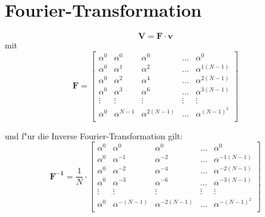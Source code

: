 \documentclass[german, 10pt, a4paper, twocolumn]{scrartcl}
\begin{document}
\appendix

\section{Fourier-Transformation}

\begin{displaymath}
	\mathbf{V} = \mathbf{F} \cdotp \mathbf{v}
\end{displaymath}
mit
\begin{displaymath}
	\mathbf{F} = \left [
		\begin{array}{ccccc}
			\alpha^0 &	\alpha^0 &	\alpha^0 &	\ldots &	\alpha^0 \\
			\alpha^0 &	\alpha^1 &	\alpha^2 &	\ldots &	\alpha^{1(N-1)} \\
			\alpha^0 &	\alpha^2 &	\alpha^4 &	\ldots &	\alpha^{2(N-1)} \\
			\alpha^0 &	\alpha^3 &	\alpha^6 &	\ldots &	\alpha^{3(N-1)} \\
			\vdots &	\vdots &	\vdots &	\vdots &	\vdots \\
			\alpha^0 &	\alpha^{N-1} &	\alpha^{2(N-1)} &	\ldots &	\alpha^{(N-1)^2} \\
		\end{array}
		\right ]
\end{displaymath}

und f"ur die Inverse Fourier-Transformation gilt:
\begin{displaymath}
	\mathbf{F^{-1}} = \frac{1}{N}\cdotp\left [
		\begin{array}{ccccc}
			\alpha^0 &	\alpha^0 &	\alpha^0 &	\ldots &	\alpha^0 \\
			\alpha^0 &	\alpha^{-1} &	\alpha^{-2} &	\ldots &	\alpha^{-1(N-1)} \\
			\alpha^0 &	\alpha^{-2} &	\alpha^{-4} &	\ldots &	\alpha^{-2(N-1)} \\
			\alpha^0 &	\alpha^{-3} &	\alpha^{-6}&	\ldots &	\alpha^{-3(N-1)} \\
			\vdots &	\vdots &	\vdots &	\vdots &	\vdots \\
			\alpha^0 &	\alpha^{-(N-1)} &	\alpha^{-2(N-1)} &	\ldots &	\alpha^{-(N-1)^2} \\
		\end{array}
		\right ]
\end{displaymath}


\end{document}
